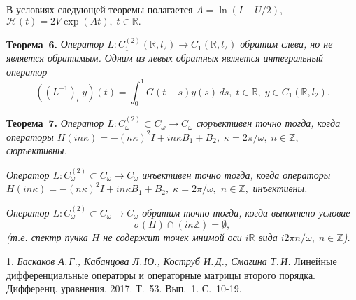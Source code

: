 В условиях следующей теоремы полагается \linebreak $A=\ln(I-U/2),$
$\mathcal{H}(t)=2V\exp(At),\;t\in \mathbb{R}.$

\textbf{Теорема~6.} {\it Оператор $L:C_{1}^{(2)}(\mathbb{R},l_2)\rightarrow C_{1}(\mathbb{R},l_2)$
 обратим слева, но не является обратимым. Одним из левых обратных является интегральный оператор}
$$((L^{-1})_l\;y)(t)=\int_0^{1}G(t-s)y(s)\,ds,\; t\in \mathbb{R},\;y\in C_{1}(\mathbb{R},l_2).$$

\textbf{Теорема~7.} {\it Оператор $L:C^{(2)}_\omega\subset C_\omega\rightarrow C_\omega$ сюръективен точно тогда,
когда операторы $H (in\kappa)=-(n\kappa)^2I+in\kappa B_1+B_2,\;\kappa=2\pi/\omega,\;n\in\mathbb{Z},$
 сюръективны.}

 \textit{Оператор $L:C^{(2)}_\omega\subset C_\omega\rightarrow C_\omega$ инъективен точно тогда,
 когда операторы $ H (in\kappa)=-(n\kappa)^2I+in\kappa B_1+B_2,\;\kappa=2\pi/\omega,$ $n\in\mathbb{Z},$}\textit{ инъективны.}

\textit{Оператор $L:C^{(2)}_\omega\subset C_\omega\rightarrow C_\omega$ обратим точно тогда, когда
выполнено условие
$$\sigma(H)\cap (i\kappa\mathbb{Z})=\emptyset,
$$
(т.е. спектр пучка $H$ не содержит точек мнимой оси $i\mathbb{R}$ вида $i2\pi n/\omega,\;n\in \mathbb{Z}$).}

\litlist

1. {\it Баскаков А.\,Г., Кабанцова Л.\,Ю., Коструб И.\,Д., Смагина Т.\,И. }
Линейные дифференциальные операторы и операторные матрицы второго порядка. Дифференц. уравнения. 2017. Т.~53. Вып.~1.
С.~10-19.
